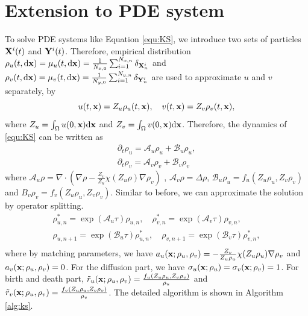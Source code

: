 \documentclass[preprint,12pt]{elsarticle}
\theoremstyle{definition}
\theoremstyle{remark}
\begin{document}
\section{Extension to PDE system}
\label{sec:extension}
To solve PDE systems like Equation \eqref{equ:KS}, we introduce two sets of particles $\mathbf{X}^i(t)$ and $\mathbf{Y}^i(t)$. Therefore, empirical distribution $\rho_u(t,\mathrm{d} \mathbf{x} ) = \mu_u(t,\mathrm{d} \mathbf{x}) =  \frac{1}{N_{x,0}}\sum_{i=1}^{N_{x,n}}\delta_{\mathbf{X}_n^i} $ and $\rho_v(t,\mathrm{d} \mathbf{x} ) = \mu_v(t,\mathrm{d} \mathbf{x}) =  \frac{1}{N_{y,0}}\sum_{i=1}^{N_{y,n}}\delta_{\mathbf{Y}_n^i}$ are used to approximate $u$ and $v$ separately, by 
\begin{equation}
    u(t,\mathbf{x}) =  Z_u \rho_u(t,\mathbf{x}), \quad v(t,\mathbf{x}) =  Z_v \rho_v(t,\mathbf{x}),
\end{equation}
where $Z_u = \int_\Omega u(0,\mathbf{x}) \mathrm{d} \mathbf{x}$ and $Z_v = \int_\Omega v(0,\mathbf{x}) \mathrm{d} \mathbf{x}$. Therefore, the dynamics of \eqref{equ:KS} can be written as 
\begin{equation}
    \begin{aligned}
        \partial_t \rho_u =  \mathcal A_u \rho_u + \mathcal B_u \rho_u,\\
        \partial_t \rho_v =  \mathcal A_v \rho_v + \mathcal B_v \rho_v
    \end{aligned}
\end{equation}
where $\mathcal A_u \rho = \nabla \cdot ( \nabla \rho - \frac{Z_v}{Z_u} \chi(Z_u\rho) \nabla \rho_v)$ , $\mathcal A_v \rho = \Delta \rho$, $\mathcal B_u \rho_u  = f_u(Z_u\rho_u,Z_v \rho_v)$ and $B_v \rho_v = f_v(Z_u\rho_u,Z_v \rho_v)$. Similar to before, we can approximate the solution by operator splitting. 
\begin{equation}
    \begin{aligned}
        \rho_{u,n}^*  =  \exp(\mathcal A_u\tau) \rho_{u,n}, \quad 
         \rho_{v,n}^*  =  \exp(\mathcal A_v\tau) \rho_{v,n},  \\
         \rho_{u,n+1} =  \exp(\mathcal B_u\tau) \rho_{u,n}^*,  \quad 
         \rho_{v,n+1}  =  \exp(\mathcal B_v\tau) \rho_{v,n}^*,   \\
    \end{aligned}
\end{equation}
where by matching parameters, we have $a_u(\mathbf{x};\rho_u,\rho_v) =  - \frac{Z_v}{Z_u\rho_u} \chi(Z_u\rho_u) \nabla \rho_v $ and $a_v(\mathbf{x};\rho_u,\rho_v)= 0$. For the diffusion part, we have $\sigma_u(\mathbf{x};\rho_u) = \sigma_v(\mathbf{x};\rho_v) = 1$. For birth and death part, $\tilde r_u (\mathbf{x};\rho_u,\rho_v)=  \frac{f_u(Z_u\rho_u,Z_v \rho_v)}{\rho_u}  $ and $\tilde r_v (\mathbf{x};\rho_u,\rho_v )=  \frac{f_v(Z_u\rho_u,Z_v \rho_v)}{\rho_v}  $. The detailed algorithm is shown in  Algorithm \ref{alg:ks}.
\end{document}
